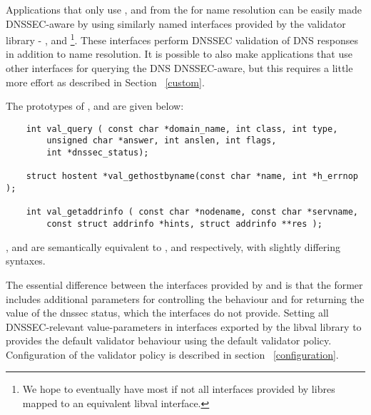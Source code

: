 Applications that only use ,  and
 from the  for name resolution can be
easily made DNSSEC-aware by using similarly named interfaces provided by the
validator library -  , 
and  \footnote{We hope to eventually have most if not
all interfaces provided by libres mapped to an equivalent libval interface.}. 
These interfaces perform DNSSEC validation of DNS responses in addition to name
resolution.  It is possible to also make applications that use other interfaces 
for querying the DNS DNSSEC-aware, but this requires a little more effort as 
described in Section ~\ref{custom}.
                                                                                                                             
The prototypes of , 
and  are given below:

\begin{verbatim}
    int val_query ( const char *domain_name, int class, int type,
        unsigned char *answer, int anslen, int flags,
        int *dnssec_status);

    struct hostent *val_gethostbyname(const char *name, int *h_errnop );

    int val_getaddrinfo ( const char *nodename, const char *servname,
        const struct addrinfo *hints, struct addrinfo **res );
\end{verbatim}
                                                                                                                             
,  and 
are semantically equivalent to ,  and
 respectively, with slightly differing syntaxes.

The essential difference between the interfaces provided by
 and  is that the former includes additional
parameters for controlling the behaviour and for returning the value of
the dnssec status, which the  interfaces do not provide.  Setting all
DNSSEC-relevant  value-parameters in interfaces exported by the libval library
to    provides the default validator behaviour using the default validator policy.
Configuration of the validator policy is described in section ~\ref{configuration}.
                                                                                                                             
